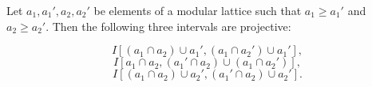 Let $a_1, a_1', a_2, a_2'$ be elements of a modular lattice such that $a_1 \geq a_1'$ and $a_2 \geq a_2'$. Then the following three intervals are projective:

$$I[(a_1 \cap a_2) \cup a_1', (a_1 \cap a_2') \cup a_1'],$$
$$I[a_1 \cap a_2, (a_1' \cap a_2) \cup (a_1 \cap a_2')],$$
$$I[(a_1 \cap a_2) \cup a_2', (a_1' \cap a_2) \cup a_2'].$$
